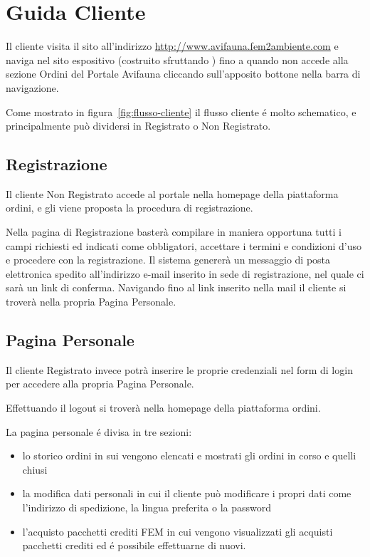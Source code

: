 \chapter{Guida Cliente}
\label{app:cliente}
Il cliente visita il sito all'indirizzo \url{http://www.avifauna.fem2ambiente.com} e naviga nel sito espositivo (costruito sfruttando {\wp}) fino a quando non accede alla sezione \textsf{Ordini} del Portale Avifauna cliccando sull'apposito bottone nella barra di navigazione.

Come mostrato in figura~\ref{fig:flusso-cliente} il flusso cliente é molto schematico, e principalmente può dividersi in \textsf{Registrato} o \textsf{Non Registrato}.

\section*{Registrazione}
Il cliente \textsf{Non Registrato} accede al portale nella homepage della piattaforma ordini, e gli viene proposta la procedura di registrazione.

Nella pagina di \textsf{Registrazione} basterà compilare in maniera opportuna tutti i campi richiesti ed indicati come obbligatori, accettare i termini e condizioni d'uso e procedere con la registrazione. Il sistema genererà un messaggio di posta elettronica spedito all'indirizzo e-mail inserito in sede di registrazione, nel quale ci sarà un link di conferma. Navigando fino al link inserito nella mail il cliente si troverà nella propria \textsf{Pagina Personale}.

\section*{Pagina Personale}
Il cliente \textsf{Registrato} invece potrà inserire le proprie credenziali nel form di login per accedere alla propria \textsf{Pagina Personale}.

Effettuando il \textsf{logout} si troverà nella homepage della piattaforma ordini.

La pagina personale é divisa in tre sezioni: 
\begin{itemize}
 \item lo \textsf{storico ordini} in sui vengono elencati e mostrati gli ordini in corso e quelli chiusi
 \item la \textsf{modifica dati personali} in cui il cliente può modificare i propri dati come l'indirizzo di spedizione, la lingua preferita o la password
 \item l'acquisto \textsf{pacchetti crediti FEM} in cui vengono visualizzati gli acquisti pacchetti crediti ed é possibile effettuarne di nuovi.
\end{itemize}


